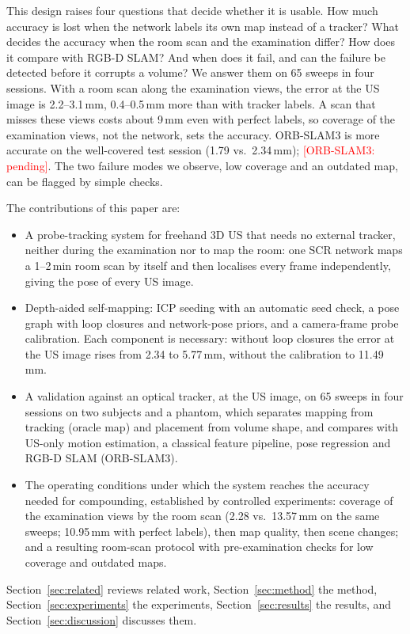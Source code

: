 \documentclass[journal]{IEEEtran}
\newcommand{\ORBP}{\textcolor{red}{[ORB-SLAM3: pending]}}
\begin{document}
This design raises four questions that decide whether it is usable. How much accuracy is lost when the network labels its own map instead of a tracker? What decides the accuracy when the room scan and the examination differ? How does it compare with RGB-D SLAM? And when does it fail, and can the failure be detected before it corrupts a volume? We answer them on 65 sweeps in four sessions. With a room scan along the examination views, the error at the US image is 2.2--3.1\,mm, 0.4--0.5\,mm more than with tracker labels. A scan that misses these views costs about 9\,mm even with perfect labels, so coverage of the examination views, not the network, sets the accuracy. ORB-SLAM3 is more accurate on the well-covered test session (1.79 vs.\ 2.34\,mm); \ORBP. The two failure modes we observe, low coverage and an outdated map, can be flagged by simple checks.

The contributions of this paper are:
\begin{itemize}
  \item A probe-tracking system for freehand 3D US that needs no external tracker, neither during the examination nor to map the room: one SCR network maps a 1--2\,min room scan by itself and then localises every frame independently, giving the pose of every US image.
  \item Depth-aided self-mapping: ICP seeding with an automatic seed check, a pose graph with loop closures and network-pose priors, and a camera-frame probe calibration. Each component is necessary: without loop closures the error at the US image rises from 2.34 to 5.77\,mm, without the calibration to 11.49\,mm.
  \item A validation against an optical tracker, at the US image, on 65 sweeps in four sessions on two subjects and a phantom, which separates mapping from tracking (oracle map) and placement from volume shape, and compares with US-only motion estimation, a classical feature pipeline, pose regression and RGB-D SLAM (ORB-SLAM3).
  \item The operating conditions under which the system reaches the accuracy needed for compounding, established by controlled experiments: coverage of the examination views by the room scan (2.28 vs.\ 13.57\,mm on the same sweeps; 10.95\,mm with perfect labels), then map quality, then scene changes; and a resulting room-scan protocol with pre-examination checks for low coverage and outdated maps.
\end{itemize}

Section~\ref{sec:related} reviews related work, Section~\ref{sec:method} the method, Section~\ref{sec:experiments} the experiments, Section~\ref{sec:results} the results, and Section~\ref{sec:discussion} discusses them.
\end{document}
